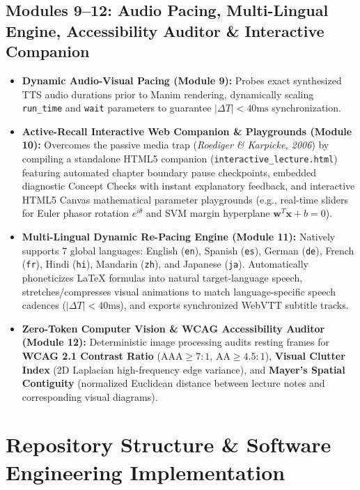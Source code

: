 \documentclass[11pt, a4paper]{article}
\begin{document}
\subsection{Modules 9--12: Audio Pacing, Multi-Lingual Engine, Accessibility Auditor \& Interactive Companion}
\begin{itemize}[leftmargin=*]
    \item \textbf{Dynamic Audio-Visual Pacing (Module 9):} Probes exact synthesized TTS audio durations prior to Manim rendering, dynamically scaling \texttt{run\_time} and \texttt{wait} parameters to guarantee $|\Delta T| < 40\text{ms}$ synchronization.
    \item \textbf{Active-Recall Interactive Web Companion \& Playgrounds (Module 10):} Overcomes the passive media trap (\textit{Roediger \& Karpicke, 2006}) by compiling a standalone HTML5 companion (\texttt{interactive\_lecture.html}) featuring automated chapter boundary pause checkpoints, embedded diagnostic Concept Checks with instant explanatory feedback, and interactive HTML5 Canvas mathematical parameter playgrounds (e.g., real-time sliders for Euler phasor rotation $e^{i\theta}$ and SVM margin hyperplane $\mathbf{w}^T\mathbf{x} + b = 0$).
    \item \textbf{Multi-Lingual Dynamic Re-Pacing Engine (Module 11):} Natively supports 7 global languages: English (\texttt{en}), Spanish (\texttt{es}), German (\texttt{de}), French (\texttt{fr}), Hindi (\texttt{hi}), Mandarin (\texttt{zh}), and Japanese (\texttt{ja}). Automatically phoneticizes \LaTeX{} formulas into natural target-language speech, stretches/compresses visual animations to match language-specific speech cadences ($|\Delta T| < 40\text{ms}$), and exports synchronized WebVTT subtitle tracks.
    \item \textbf{Zero-Token Computer Vision \& WCAG Accessibility Auditor (Module 12):} Deterministic image processing audits resting frames for \textbf{WCAG 2.1 Contrast Ratio} ($\text{AAA} \ge 7:1$, $\text{AA} \ge 4.5:1$), \textbf{Visual Clutter Index} (2D Laplacian high-frequency edge variance), and \textbf{Mayer's Spatial Contiguity} (normalized Euclidean distance between lecture notes and corresponding visual diagrams).
\end{itemize}

\section{Repository Structure \& Software Engineering Implementation}
\end{document}
